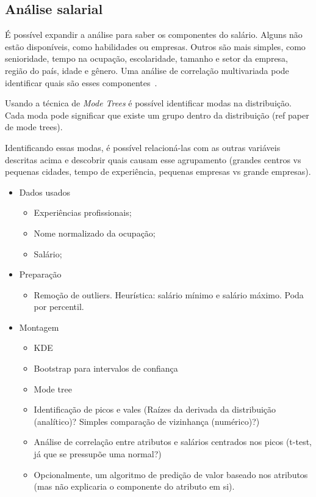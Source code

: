 \documentclass[12pt,a4paper]{article}
\begin{document}
\subsection{Análise salarial}

É possível expandir a análise para saber os componentes do salário. Alguns não estão  disponíveis, como habilidades ou empresas. Outros são mais simples, como senioridade, tempo na ocupação, escolaridade, tamanho e setor da empresa, região do país, idade e gênero. Uma análise de correlação multivariada pode identificar quais são esses componentes~.

Usando a técnica de \textit{Mode Trees} é possível identificar modas na distribuição. Cada moda pode significar que existe um grupo dentro da distribuição (ref paper de mode trees).

Identificando essas modas, é possível relacioná-las com as outras variáveis descritas acima e descobrir quais causam esse agrupamento (grandes centros vs pequenas cidades, tempo de experiência, pequenas empresas vs grande empresas).

\begin{itemize}
\item Dados usados
	\begin{itemize}
	\item Experiências profissionais;
    \item Nome normalizado da ocupação;
    \item Salário;
	\end{itemize}
\item Preparação
	\begin{itemize}
    \item Remoção de outliers. Heurística: salário mínimo e salário máximo. Poda por percentil.
	\end{itemize}
\item Montagem
	\begin{itemize}
	\item KDE
    \item Bootstrap para intervalos de confiança
    \item Mode tree
    \item Identificação de picos e vales (Raízes da derivada da distribuição (analítico)? Simples comparação de vizinhança (numérico)?)
    \item Análise de correlação entre atributos e salários centrados nos picos (t-test, já que se pressupõe uma normal?)
    \item Opcionalmente, um algoritmo de predição de valor baseado nos atributos (mas não explicaria o componente do atributo em si).
	\end{itemize}
\end{itemize}
\end{document}
